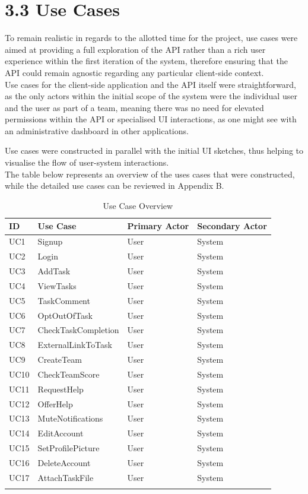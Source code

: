 



\section{3.3 Use Cases}\label{use-cases}

To remain realistic in regards to the allotted time for the project, use
cases were aimed at providing a full exploration of the API rather than
a rich user experience within the first iteration of the system,
therefore ensuring that the API could remain agnostic regarding any
particular client-side context.\\
Use cases for the client-side application and the API itself were
straightforward, as the only actors within the initial scope of the
system were the individual user and the user as part of a team, meaning
there was no need for elevated permissions within the API or specialised
UI interactions, as one might see with an administrative dashboard in
other applications.

Use cases were constructed in parallel with the initial UI sketches,
thus helping to visualise the flow of user-system interactions.\\
The table below represents an overview of the uses cases that
were constructed, while the detailed use cases can be reviewed in Appendix B.

\begin{longtable}[]{@{}llll@{}}
\toprule
ID & Use Case & Primary Actor & Secondary Actor\tabularnewline
\midrule
\endhead
UC1 & Signup & User & System\tabularnewline
UC2 & Login & User & System\tabularnewline
UC3 & AddTask & User & System\tabularnewline
UC4 & ViewTasks & User & System\tabularnewline
UC5 & TaskComment & User & System\tabularnewline
UC6 & OptOutOfTask & User & System\tabularnewline
UC7 & CheckTaskCompletion & User & System\tabularnewline
UC8 & ExternalLinkToTask & User & System\tabularnewline
UC9 & CreateTeam & User & System\tabularnewline
UC10 & CheckTeamScore & User & System\tabularnewline
UC11 & RequestHelp & User & System\tabularnewline
UC12 & OfferHelp & User & System\tabularnewline
UC13 & MuteNotifications & User & System\tabularnewline
UC14 & EditAccount & User & System\tabularnewline
UC15 & SetProfilePicture & User & System\tabularnewline
UC16 & DeleteAccount & User & System\tabularnewline
UC17 & AttachTaskFile & User & System\tabularnewline
\bottomrule
\caption{Use Case Overview}
\end{longtable}

